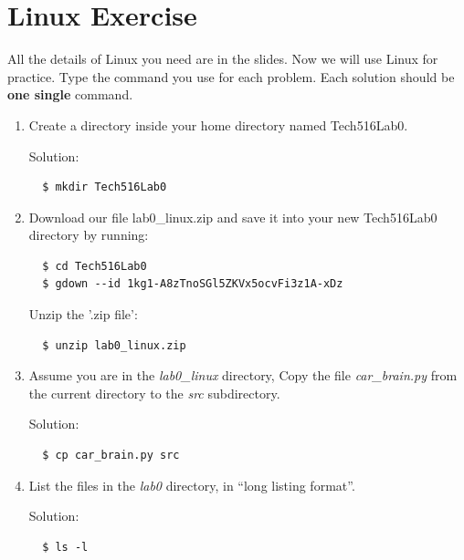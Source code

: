 \documentclass[12pt]{article}
\begin{document}
	\MakeScribeTop



\section {Linux Exercise}
All the details of Linux you need are in the slides. Now we will use Linux for practice. Type the command you use for each problem. Each solution should be \textbf{one single} command. 

\begin{enumerate}
\item Create a directory inside your home directory named Tech516Lab0.

Solution: 

\begin{verbatim}
  $ mkdir Tech516Lab0
\end{verbatim}

\item Download our file lab0\_linux.zip and save it into your new Tech516Lab0 directory by running:



\begin{verbatim}
  $ cd Tech516Lab0    
  $ gdown --id 1kg1-A8zTnoSGl5ZKVx5ocvFi3z1A-xDz
\end{verbatim}

Unzip the '.zip file':
\begin{verbatim}
  $ unzip lab0_linux.zip
\end{verbatim}

\item Assume you are in the \textit{lab0\_linux} directory, Copy the file \textit{car\_brain.py} from the current directory to the \textit{src} subdirectory.

Solution:

\begin{verbatim}
  $ cp car_brain.py src
\end{verbatim}

\item List the files in the \textit{lab0} directory, in “long listing format”.

Solution:

\begin{verbatim}
  $ ls -l
\end{verbatim}


\end{enumerate}
\end{document}
